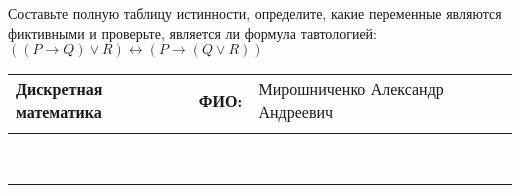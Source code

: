 \documentclass[10pt]{exam}
\newcommand{\class}{Дискретная математика}
\newcommand{\examdate}{}
\begin{document}
\begin{questions}
\begin{enumerate} [a)]
\end{enumerate}\question Составьте полную таблицу истинности, определите, какие переменные являются фиктивными и проверьте, является ли формула тавтологией:
$((P \rightarrow Q) \lor R) \leftrightarrow (P \rightarrow (Q \lor R))$

\end{questions}
\newpage
\begin{flushright}
\begin{tabular}{p{2.8in} r l}
\textbf{\class} & \textbf{ФИО:} &Мирошниченко Александр Андреевич
\\

\textbf{\examdate} &&\\
\end{tabular}\\
\end{flushright}
\rule[1ex]{\textwidth}{.1pt}
\end{document}

